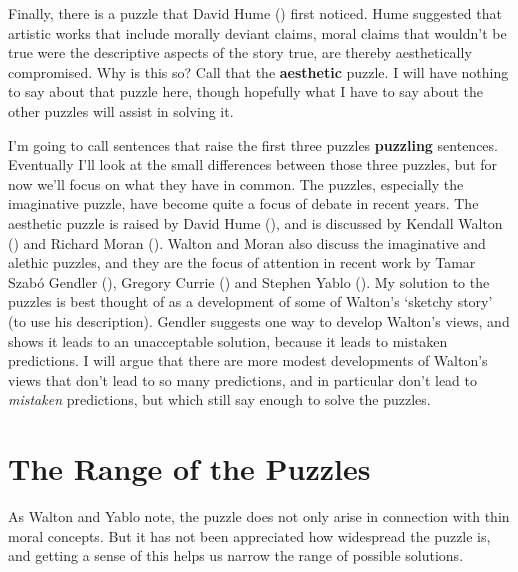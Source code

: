 \documentclass[
  11pt,
  letterpaper,
  DIV=11,
  numbers=noendperiod,
  twoside]{scrartcl}
\begin{document}
Finally, there is a puzzle that David Hume
() first noticed. Hume suggested that
artistic works that include morally deviant claims, moral claims that
wouldn't be true were the descriptive aspects of the story true, are
thereby aesthetically compromised. Why is this so? Call that the
\textbf{aesthetic} puzzle. I will have nothing to say about that puzzle
here, though hopefully what I have to say about the other puzzles will
assist in solving it.

I'm going to call sentences that raise the first three puzzles
\textbf{puzzling} sentences. Eventually I'll look at the small
differences between those three puzzles, but for now we'll focus on what
they have in common. The puzzles, especially the imaginative puzzle,
have become quite a focus of debate in recent years. The aesthetic
puzzle is raised by David Hume (), and is
discussed by Kendall Walton () and
Richard Moran (). Walton and Moran also
discuss the imaginative and alethic puzzles, and they are the focus of
attention in recent work by Tamar Szabó Gendler
(), Gregory Currie
() and Stephen Yablo
(). My solution to the puzzles is best
thought of as a development of some of Walton's `sketchy story' (to use
his description). Gendler suggests one way to develop Walton's views,
and shows it leads to an unacceptable solution, because it leads to
mistaken predictions. I will argue that there are more modest
developments of Walton's views that don't lead to so many predictions,
and in particular don't lead to \emph{mistaken} predictions, but which
still say enough to solve the puzzles.

\section{The Range of the Puzzles}\label{the-range-of-the-puzzles}

As Walton and Yablo note, the puzzle does not only arise in connection
with thin moral concepts. But it has not been appreciated how widespread
the puzzle is, and getting a sense of this helps us narrow the range of
possible solutions.
\end{document}
